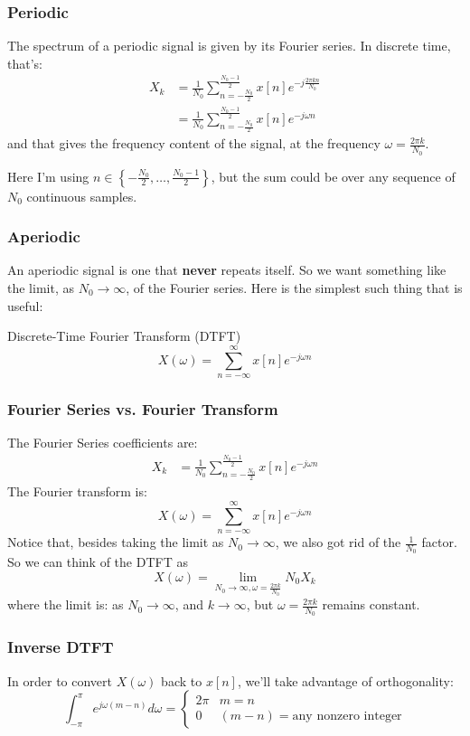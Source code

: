 \documentclass{beamer}
\begin{document}
\begin{frame}
  \frametitle{Periodic}

  The spectrum of a periodic signal is given by its Fourier series.
  In discrete time, that's:
  \begin{align*}
    X_k &= \frac{1}{N_0}\sum_{n=-\frac{N_0}{2}}^{\frac{N_0-1}{2}} x[n] e^{-j\frac{2\pi kn}{N_0}}\\
    &= \frac{1}{N_0}\sum_{n=-\frac{N_0}{2}}^{\frac{N_0-1}{2}} x[n] e^{-j\omega n}
  \end{align*}
  and that gives the frequency content of the signal, at the frequency
  $\omega=\frac{2\pi k}{N_0}$.

  Here I'm using  $n\in\left\{-\frac{N_0}{2},\ldots,\frac{N_0-1}{2}\right\}$,
  but the sum could be over any sequence of $N_0$ continuous samples.
\end{frame}

\begin{frame}
  \frametitle{Aperiodic}

  An aperiodic signal is one that {\bf never} repeats itself.  So we
  want something like the limit, as $N_0\rightarrow\infty$, of the
  Fourier series.  Here is the simplest such thing that is useful:
  \begin{block}{Discrete-Time Fourier Transform (DTFT)}
  \[
  X(\omega) = \sum_{n=-\infty}^\infty x[n]e^{-j\omega n}
  \]
  \end{block}
\end{frame}
    
\begin{frame}
  \frametitle{Fourier Series vs. Fourier Transform}

  The Fourier Series coefficients are:
  \begin{align*}
    X_k &= \frac{1}{N_0}\sum_{n=-\frac{N_0}{2}}^{\frac{N_0-1}{2}} x[n] e^{-j\omega n}
  \end{align*}
  The Fourier transform is:
  \[
  X(\omega) = \sum_{n=-\infty}^\infty x[n]e^{-j\omega n}
  \]
  Notice that, besides taking the limit as $N_0\rightarrow\infty$, we
  also got rid of the $\frac{1}{N_0}$ factor.  So we can think of the
  DTFT as
  \[
  X(\omega) = \lim_{N_0\rightarrow\infty,\omega=\frac{2\pi k}{N_0}} N_0 X_k
  \]
  where the limit is: as $N_0\rightarrow\infty$, and
  $k\rightarrow\infty$, but $\omega=\frac{2\pi k}{N_0}$ remains
  constant.
\end{frame}

\begin{frame}
  \frametitle{Inverse DTFT}

  In order to convert $X(\omega)$ back to $x[n]$, we'll take advantage
  of orthogonality:
  \[
  \int_{-\pi}^\pi e^{j\omega(m-n)} d\omega =
  \begin{cases}
    2\pi & m=n\\
    0 & (m-n)=\mbox{any nonzero integer}
  \end{cases}
  \]
\end{frame}
  
\end{document}
